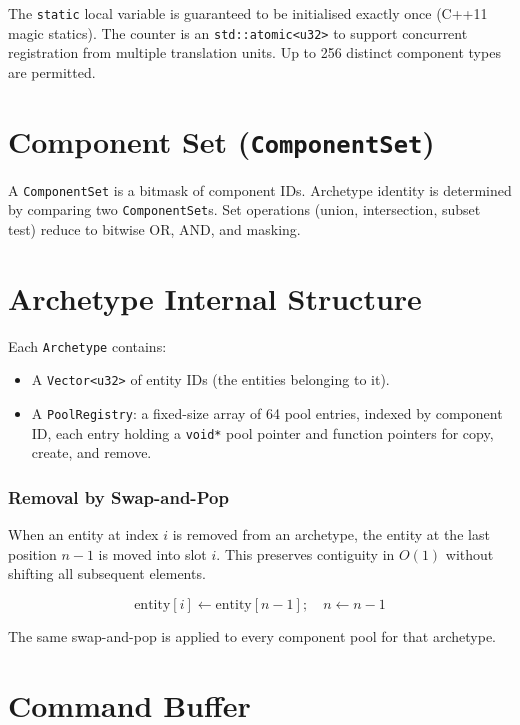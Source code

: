 The \texttt{static} local variable is guaranteed to be initialised exactly
once (C++11 magic statics). The counter is an \texttt{std::atomic<u32>}
to support concurrent registration from multiple translation units.
Up to 256 distinct component types are permitted.

\section{Component Set (\texttt{ComponentSet})}

A \texttt{ComponentSet} is a bitmask of component IDs. Archetype identity is
determined by comparing two \texttt{ComponentSet}s. Set operations (union,
intersection, subset test) reduce to bitwise OR, AND, and masking.

\section{Archetype Internal Structure}

Each \texttt{Archetype} contains:
\begin{itemize}
  \item A \texttt{Vector<u32>} of entity IDs (the entities belonging to it).
  \item A \texttt{PoolRegistry}: a fixed-size array of 64 pool entries,
        indexed by component ID, each entry holding a \texttt{void*} pool
        pointer and function pointers for copy, create, and remove.
\end{itemize}

\subsubsection{Removal by Swap-and-Pop}

When an entity at index $i$ is removed from an archetype, the entity at
the last position $n-1$ is moved into slot $i$. This preserves contiguity
in $O(1)$ without shifting all subsequent elements.

\begin{equation}
\text{entity}[i] \leftarrow \text{entity}[n-1]; \quad n \leftarrow n-1
\end{equation}

The same swap-and-pop is applied to every component pool for that
archetype.

\section{Command Buffer}

